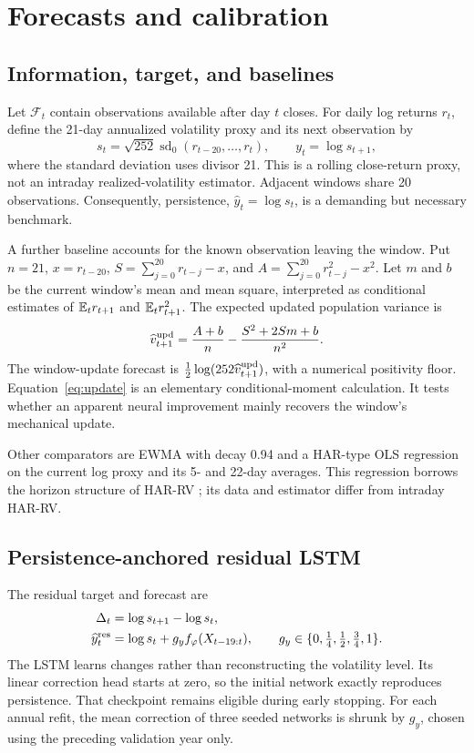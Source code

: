 \section{Forecasts and calibration}
\subsection{Information, target, and baselines}
Let $\mathcal F_t$ contain observations available after day $t$ closes. For daily log returns $r_t$, define the 21-day annualized volatility proxy and its next observation by
\begin{equation}
s_t=\sqrt{252}\operatorname{sd}_0(r_{t-20},\ldots,r_t),\qquad y_t=\log s_{t+1},
\end{equation}
where the standard deviation uses divisor 21. This is a rolling close-return proxy, not an intraday realized-volatility estimator. Adjacent windows share 20 observations. Consequently, persistence, $\widehat y_t=\log s_t$, is a demanding but necessary benchmark.

A further baseline accounts for the known observation leaving the window. Put $n=21$, $x=r_{t-20}$, $S=\sum_{j=0}^{20}r_{t-j}-x$, and $A=\sum_{j=0}^{20}r_{t-j}^2-x^2$. Let $m$ and $b$ be the current window's mean and mean square, interpreted as conditional estimates of $\mathbb{E}_t r_{t+1}$ and $\mathbb{E}_t r_{t+1}^2$. The expected updated population variance is
\begin{equation}
\widehat v^{\rm upd}_{t+1}=\frac{A+b}{n}-\frac{S^2+2Sm+b}{n^2}.
\label{eq:update}
\end{equation}
The window-update forecast is $\tfrac12\log(252\widehat v^{\rm upd}_{t+1})$, with a numerical positivity floor. Equation~\eqref{eq:update} is an elementary conditional-moment calculation. It tests whether an apparent neural improvement mainly recovers the window's mechanical update.

Other comparators are EWMA with decay 0.94 and a HAR-type OLS regression on the current log proxy and its 5- and 22-day averages. This regression borrows the horizon structure of HAR-RV \cite{corsi}; its data and estimator differ from intraday HAR-RV.

\subsection{Persistence-anchored residual LSTM}
The residual target and forecast are
\begin{align}
\Delta_t&=\log s_{t+1}-\log s_t,\\
\widehat y_t^{\rm res}&=\log s_t+g_y f_\varphi(X_{t-19:t}),\qquad
g_y\in\{0,\tfrac14,\tfrac12,\tfrac34,1\}.
\label{eq:residual}
\end{align}
The LSTM learns changes rather than reconstructing the volatility level. Its linear correction head starts at zero, so the initial network exactly reproduces persistence. That checkpoint remains eligible during early stopping. For each annual refit, the mean correction of three seeded networks is shrunk by $g_y$, chosen using the preceding validation year only.


